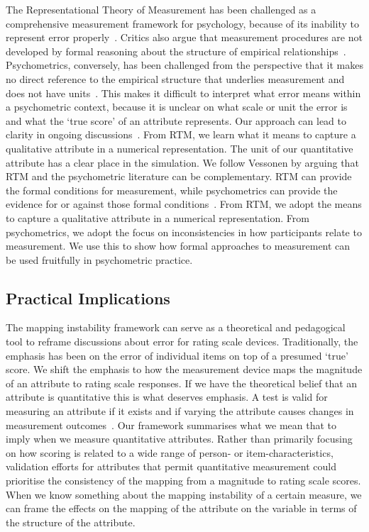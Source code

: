 \documentclass[titlepage, a4paper, 11pt]{article}
\begin{document}
The Representational Theory of Measurement has been challenged as a comprehensive measurement framework for psychology, because of its inability to represent error properly~\citep{helzner_representation_2012}. Critics also argue that measurement procedures are not developed by formal reasoning about the structure of empirical relationships~\citep{borsboom_why_2004}. Psychometrics, conversely, has been challenged from the perspective that it makes no direct reference to the empirical structure that underlies measurement and does not have units~\citep{humphry_role_2011}. This makes it difficult to interpret what error means within a psychometric context, because it is unclear on what scale or unit the error is and what the `true score' of an attribute represents. Our approach can lead to clarity in ongoing discussions~\citep{vessonen_psychometrics_2017}. From RTM, we learn what it means to capture a qualitative attribute in a numerical representation. The unit of our quantitative attribute has a clear place in the simulation. We follow Vessonen by arguing that RTM and the psychometric literature can be complementary. RTM can provide the formal conditions for measurement, while psychometrics can provide the evidence for or against those formal conditions~\citep{vessonen_complementarity_2020}. From RTM, we adopt the means to capture a qualitative attribute in a numerical representation. From psychometrics, we adopt the focus on inconsistencies in how participants relate to measurement. We use this to show how formal approaches to measurement can be used fruitfully in psychometric practice.

\subsection{Practical Implications}
The mapping instability framework can serve as a theoretical and pedagogical tool to reframe discussions about error for rating scale devices. Traditionally, the emphasis has been on the error of individual items on top of a presumed `true' score. We shift the emphasis to how the measurement device maps the magnitude of an attribute to rating scale responses. 
If we have the theoretical belief that an attribute is quantitative this is what deserves emphasis. A test is valid for measuring an attribute if it exists and if varying the attribute causes changes in measurement outcomes~\citep{borsboom_concept_2004}. Our framework summarises what we mean that to imply when we measure quantitative attributes. Rather than primarily focusing on how scoring is related to a wide range of person- or item-characteristics, validation efforts for attributes that permit quantitative measurement could prioritise the consistency of the mapping from a magnitude to rating scale scores. When we know something about the mapping instability of a certain measure, we can frame the effects on the mapping of the attribute on the variable in terms of the structure of the attribute. 
\end{document}
